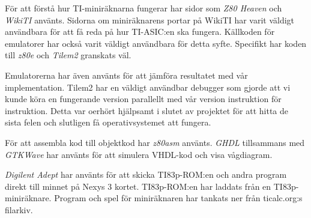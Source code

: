 \documentclass[main.tex]{subfiles}
\begin{document}
För att förstå hur TI-miniräknarna fungerar har sidor som {\it Z80 Heaven}
\cite{z80heaven} och {\it WikiTI} \cite{brandonw} använts. Sidorna om
miniräknarens portar på WikiTI har varit väldigt användbara för att få reda på
hur TI-ASIC:en ska fungera. Källkoden för emulatorer har också varit väldigt
användbara för detta syfte. Specifikt har koden till {\it z80e} \cite{z80e} och
{\it Tilem2} \cite{tilem2} granskats väl.

Emulatorerna har även använts för att jämföra resultatet med vår
implementation. Tilem2 har en väldigt användbar debugger som gjorde att vi
kunde köra en fungerande version parallellt med vår version instruktion för
instruktion. Detta var oerhört hjälpsamt i slutet av projektet för att hitta
de sista felen och slutligen få operativsystemet att fungera.

För att assembla kod till objektkod har {\it z80asm}\cite{z80asm} använts.
{\it GHDL}\cite{ghdl} tillsammans med {\it GTKWave}\cite{gtkwave} har använts
för att simulera VHDL-kod och visa vågdiagram.

{\it Digilent Adept} har använts för att skicka TI83p-ROM:en och andra program
direkt till minnet på Nexys 3 kortet. TI83p-ROM:en har laddats från en
TI83p-miniräknare. Program och spel för miniräknaren har tankats ner från
ticalc.org:s filarkiv\cite{ticalc}.

\clearpage
\end{document}
